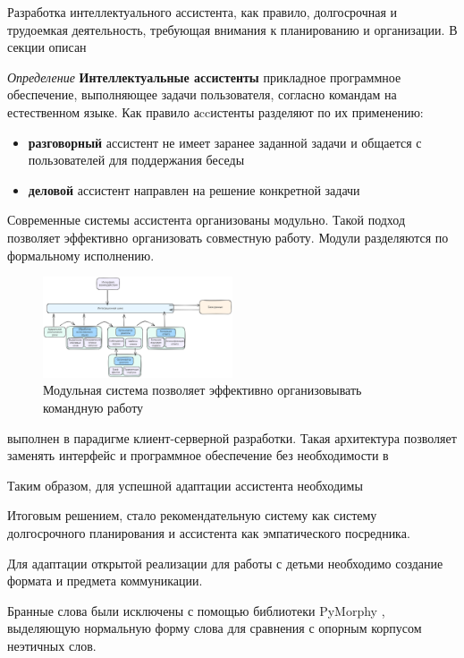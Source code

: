 Разработка интеллектуального ассистента, как правило, долгосрочная и трудоемкая деятельность, требующая внимания к планированию
и организации. В секции описан 

\textit{Определение} \textbf{Интеллектуальные ассистенты} прикладное программное обеспечение, выполняющее задачи пользователя,
согласно командам на естественном языке. Как правило аccистенты разделяют по их применению:
\begin{itemize}
    \item \textbf{разговорный} ассистент не имеет заранее заданной задачи и общается с пользователей для поддержания беседы
    \item \textbf{деловой} ассистент направлен на решение конкретной задачи
\end{itemize}
Современные системы ассистента организованы модульно. Такой подход позволяет эффективно
организовать совместную работу. Модули разделяются по формальному исполнению.


\begin{figure}[h]
    \centering
    \includegraphics[width=0.5\textwidth]{assets/work/arch/modern_system.excalidraw.png}
    \caption{Модульная система позволяет эффективно организовывать командную работу}
    \label{modular}
\end{figure}




выполнен в парадигме клиент-серверной разработки. Такая архитектура
позволяет заменять интерфейс и программное обеспечение без необходимости в 

Таким образом, для успешной адаптации ассистента необходимы

Итоговым решением, стало  рекомендательную систему как систему долгосрочного планирования и ассистента как эмпатического посредника.





Для адаптации открытой реализации для работы с детьми необходимо создание формата и предмета коммуникации.

Бранные слова были исключены с помощью библиотеки PyMorphy \cite{Korobov2015morph}, выделяющую нормальную форму слова для сравнения
с опорным корпусом неэтичных слов.

